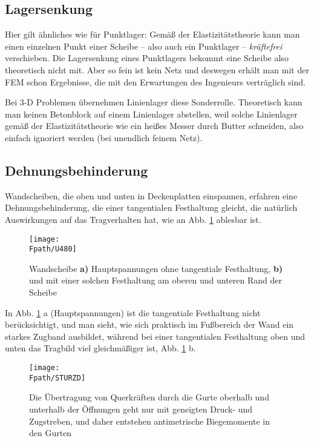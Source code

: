 {{\textcolor{sectionTitleBlue}{\subsection{Lagersenkung}}}
Hier gilt \"{a}hnliches wie f\"{u}r Punktlager: Gem\"{a}{\ss} der Elastizit\"{a}tstheorie kann man einen einzelnen Punkt einer Scheibe -- also auch  ein Punktlager --  {\em kr\"{a}ftefrei\/} verschieben. Die Lagersenkung eines Punktlagers bekommt eine Scheibe also theoretisch nicht mit. Aber so fein ist kein Netz und deswegen erh\"{a}lt man mit der FEM schon Ergebnisse, die mit den Erwartungen des Ingenieurs vertr\"{a}glich sind.

Bei 3-D Problemen \"{u}bernehmen Linienlager diese Sonderrolle. Theoretisch kann man keinen Betonblock auf einem Linienlager abstellen, weil solche Linienlager gem\"{a}{\ss} der Elastizit\"{a}tstheorie wie ein hei{\ss}es Messer durch Butter schneiden, also einfach ignoriert werden (bei unendlich feinem Netz).

{\textcolor{sectionTitleBlue}{\subsection{Dehnungsbehinderung}}}
Wandscheiben, die oben und unten in Deckenplatten einspannen, erfahren eine
Dehnungsbehinderung, die einer tangentialen Festhaltung gleicht, die nat\"{u}rlich
Auswirkungen auf das Tragverhalten hat, wie an Abb. \ref{ScheibeTang2} ablesbar ist.
\begin{figure}[tbp] \centering
\if {} \sidecaption \fi
\texttt{[image: \\Fpath/U480]}  %
\caption{Wandscheibe {\bf a)} Hauptspannungen ohne tangentiale Festhaltung, {\bf b)} und mit
einer solchen Festhaltung am oberen und unteren Rand der Scheibe} \label{ScheibeTang2}
\end{figure}%
In Abb. \ref{ScheibeTang2} a (Hauptspannungen) ist die tangentiale Festhaltung nicht ber\"{u}cksichtigt, und man sieht, wie sich praktisch im Fu{\ss}bereich der Wand ein starkes Zugband ausbildet, w\"{a}hrend bei einer tangentialen Festhaltung oben und unten das Tragbild viel gleichm\"{a}{\ss}iger ist,  Abb. \ref{ScheibeTang2} b.
\begin{figure}[tbp] \centering
\if {} \sidecaption \fi
\texttt{[image: \\Fpath/STURZD]}
\caption{Die \"{U}bertragung von Querkr\"{a}ften durch die Gurte oberhalb und unterhalb der
\"{O}ffnungen geht nur mit geneigten Druck- und Zugstreben, und daher entstehen antimetrische
Biegemomente in den Gurten} \label{Sturz}
\end{figure}%

}
